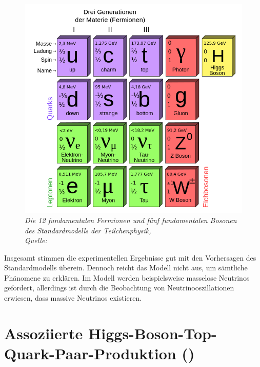 \begin{figure}[hhh]
 \begin{center}
   \includegraphics[width=\textwidth]{graphics/Standard_Model.png}
   \parbox[b]{12cm}{
     \caption[Standardmodell der Teilchenphysik]
             {\label{fig:Standardmodell} \it Die 12 fundamentalen Fermionen und f\"unf fundamentalen Bosonen des Standardmodells der Teilchenphysik,\\ Quelle: \cite{wiki:Standardmodell}}
   }
 \end{center}
\end{figure}

Insgesamt stimmen die experimentellen Ergebnisse gut mit den Vorhersagen des Standardmodells \"uberein. Dennoch reicht das Modell nicht aus, um s\"amtliche Ph\"anomene zu erkl\"aren. Im Modell werden beispielsweise masselose Neutrinos gefordert, allerdings ist durch die Beobachtung von Neutrinooszillationen erwiesen, dass massive Neutrinos existieren.

\section{Assoziierte Higgs-Boson-Top-Quark-Paar-Produktion (\ttH)}
\label{ch:Theorie:sec:ttH}

